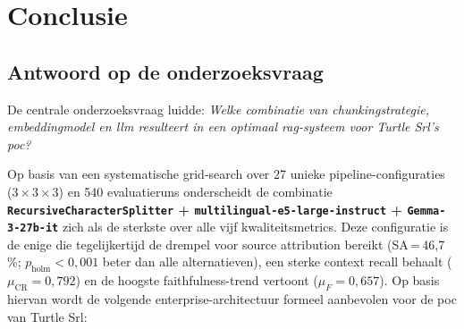 \chapter{Conclusie}%
\label{ch:conclusie}

\section{Antwoord op de onderzoeksvraag}
\label{sec:antwoord-onderzoeksvraag}

De centrale onderzoeksvraag luidde: \textit{Welke combinatie van chunkingstrategie, embeddingmodel en \gls{llm} resulteert in een optimaal \gls{rag}-systeem voor Turtle Srl's \gls{poc}?}

Op basis van een systematische grid-search over 27 unieke pipeline-configuraties (3\,×\,3\,×\,3) en 540 evaluatieruns onderscheidt de combinatie \textbf{\texttt{RecursiveCharacterSplitter} + \texttt{multilingual-e5-large-instruct} + \texttt{Gemma-3-27b-it}} zich als de sterkste over alle vijf kwaliteitsmetrics. Deze configuratie is de enige die tegelijkertijd de drempel voor source attribution bereikt (SA\,=\,46{,}7\,\%; $p_{\text{holm}} < 0{,}001$ beter dan alle alternatieven), een sterke context recall behaalt ($\mu_{\text{CR}} = 0{,}792$) en de hoogste faithfulness-trend vertoont ($\mu_F = 0{,}657$). Op basis hiervan wordt de volgende enterprise-architectuur formeel aanbevolen voor de \gls{poc} van Turtle Srl:

